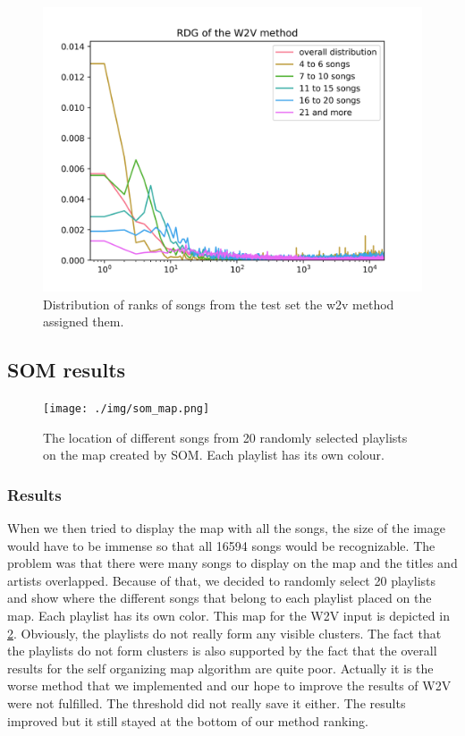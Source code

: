 \begin{figure}[h]
    \centering
	\includegraphics[width=120mm]{./img/w2v_graph.png}
	\caption{Distribution of ranks of songs from the test set the w2v method assigned them.}
	\label{fig:w2v_distribution}
\end{figure}

\subsection{SOM results}

\begin{figure}[h]
    \centering
	\texttt{[image: ./img/som\_map.png]}
	\caption{The location of different songs from 20 randomly selected playlists on the map created by SOM. Each playlist has its own colour.}
	\label{fig:som_map}
\end{figure}
\subsubsection{Results}
When we then tried to display the map with all the songs, the size of the image would have to be immense so that all 16594 songs would be recognizable. The problem was that there were many songs to display on the map and the titles and artists overlapped. Because of that, we decided to randomly select 20 playlists and show where the different songs that belong to each playlist placed on the map. Each playlist has its own color. This map for the W2V input is depicted in \ref{fig:som_map}. Obviously, the playlists do not really form any visible clusters.
The fact that the playlists do not form clusters is also supported by the fact that the overall results for the self organizing map algorithm are quite poor. Actually it is the worse method that we implemented and our hope to improve the results of W2V were not fulfilled. The threshold did not really save it either. The results improved but it still stayed at the bottom of our method ranking.

